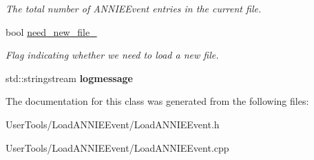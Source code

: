 \begin{DoxyCompactItemize}
\begin{DoxyCompactList}\small\item\em The total number of ANNIEEvent entries in the current file. \item\end{DoxyCompactList}\item 
\hypertarget{classLoadANNIEEvent_a276ac0416e1310830598036af7e2c0e3}{
bool \hyperlink{classLoadANNIEEvent_a276ac0416e1310830598036af7e2c0e3}{need\_\-new\_\-file\_\-}}
\label{classLoadANNIEEvent_a276ac0416e1310830598036af7e2c0e3}

\begin{DoxyCompactList}\small\item\em Flag indicating whether we need to load a new file. \item\end{DoxyCompactList}\item 
\hypertarget{classLoadANNIEEvent_a04316d23550d9c2f36f35f55ec054d20}{
std::stringstream {\bfseries logmessage}}
\label{classLoadANNIEEvent_a04316d23550d9c2f36f35f55ec054d20}

\end{DoxyCompactItemize}


The documentation for this class was generated from the following files:\begin{DoxyCompactItemize}
\item 
UserTools/LoadANNIEEvent/LoadANNIEEvent.h\item 
UserTools/LoadANNIEEvent/LoadANNIEEvent.cpp\end{DoxyCompactItemize}
